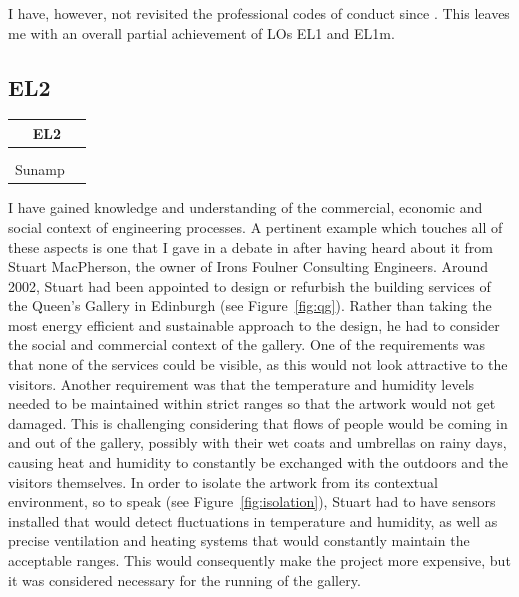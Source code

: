 I have, however, not revisited the professional codes of conduct since \PCTitle.
This leaves me with an overall partial achievement of LOs EL1 and EL1m.




\subsection*{EL2}

\begin{table}
	\begin{tabular}{|ll|}
		\hline
		\multicolumn{2}{|c|}{\cellcolor[HTML]{F8A102}\textbf{EL2} \nomaster} \\ \hline
		\ID & \DI \\
		\DST & \SIB \\
		Sunamp &  \\ \hline
	\end{tabular}
\end{table}


I have gained knowledge and understanding of the commercial, economic and social context of engineering processes.
A pertinent example which touches all of these aspects is one that I gave in a debate in \IDTitle \space after having heard about it from Stuart MacPherson, the owner of Irons Foulner Consulting Engineers.
Around 2002, Stuart had been appointed to design or refurbish the building services of the Queen's Gallery in Edinburgh (see Figure~\ref{fig:qg}).
Rather than taking the most energy efficient and sustainable approach to the design, he had to consider the social and commercial context of the gallery.
One of the requirements was that none of the services could be visible, as this would not look attractive to the visitors.
Another requirement was that the temperature and humidity levels needed to be maintained within strict ranges so that the artwork would not get damaged.
This is challenging considering that flows of people would be coming in and out of the gallery, possibly with their wet coats and umbrellas on rainy days, causing heat and humidity to constantly be exchanged with the outdoors and the visitors themselves.
In order to isolate the artwork from its contextual environment, so to speak (see Figure~\ref{fig:isolation}), Stuart had to have sensors installed that would detect fluctuations in temperature and humidity, as well as precise ventilation and heating systems that would constantly maintain the acceptable ranges.
This would consequently make the project more expensive, but it was considered necessary for the running of the gallery.

